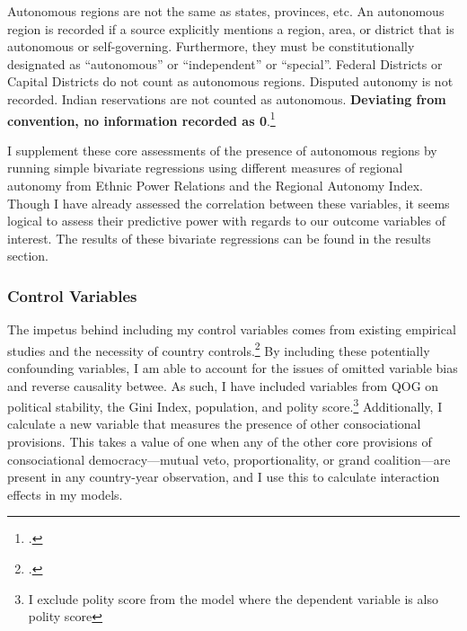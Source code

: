 \documentclass[12pt]{article}
\begin{document}
\singlespacing
Autonomous regions are not the same as states, provinces, etc. An autonomous region is recorded if a source explicitly mentions a region, area, or district that is autonomous or self-governing. Furthermore, they must be constitutionally designated as ``autonomous'' or ``independent'' or ``special''. Federal Districts or Capital Districts do not count as autonomous regions. Disputed autonomy is not recorded. Indian reservations are not counted as autonomous. \textbf{Deviating from convention, no information recorded as 0}.\footcite[emphasis in original]{keefer_database_nodate}

\doublespacing
I supplement these core assessments of the presence of autonomous regions by running simple bivariate regressions using different measures of regional autonomy from Ethnic Power Relations and the Regional Autonomy Index. Though I have already assessed the correlation between these variables, it seems logical to assess their predictive power with regards to our outcome variables of interest. The results of these bivariate regressions can be found in the results section. 

\subsubsection{Control Variables} 
The impetus behind including my control variables comes from existing empirical studies and the necessity of country controls.\footcite{hartzell_crafting_2007, kelly_power-sharing_2019, norris_evidence_2008, strom_inclusion_2017, walter_committing_2002} By including these potentially confounding variables, I am able to account for the issues of omitted variable bias and reverse causality betwee. As such, I have included variables from QOG on political stability, the Gini Index, population, and polity score.\footnote{I exclude polity score from the model where the dependent variable is also polity score} Additionally, I calculate a new variable that measures the presence of other consociational provisions. This takes a value of one when any of the other core provisions of consociational democracy---mutual veto, proportionality, or grand coalition---are present in any country-year observation, and I use this to calculate interaction effects in my models. 
\end{document}
